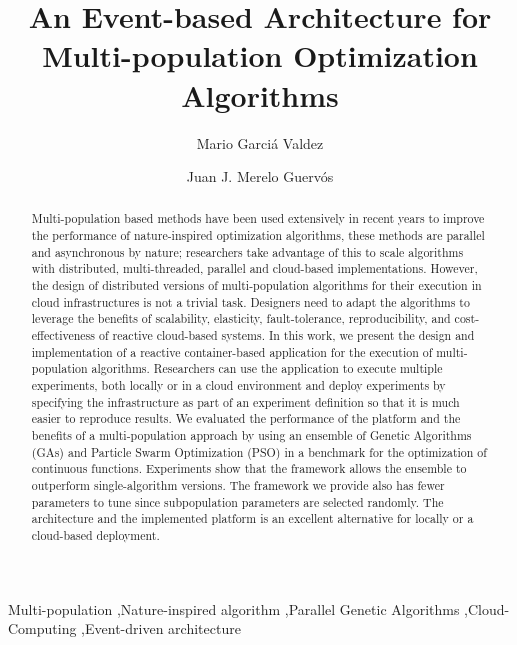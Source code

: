 \documentclass[review]{elsarticle}
\begin{document}
\begin{frontmatter}

\title{An Event-based Architecture for Multi-population Optimization Algorithms}

\author[itt]{Mario Garci\'a Valdez}

\author[granada]{Juan J. Merelo Guerv\'os}

\address[itt]{Department of Graduate Studies, Instituto Tecnol\'ogico de Tijuana, Tijuana BC, Mexico}
\address[granada]{Universidad de Granada, Granada, Spain}

\begin{abstract} 
Multi-population based methods have been used extensively in
recent years to improve the performance of nature-inspired optimization
algorithms, these methods are parallel and asynchronous by nature; researchers
take advantage of this to scale algorithms with distributed, multi-threaded,
parallel and cloud-based implementations. However, the design of distributed
versions of multi-population algorithms for their execution in cloud
infrastructures is not a trivial task. Designers need to adapt the algorithms to
leverage the benefits of scalability, elasticity, fault-tolerance,
reproducibility, and cost-effectiveness of reactive cloud-based systems. In this
work, we present the design and implementation of a reactive container-based
application for the execution of multi-population algorithms. Researchers can
use the application to execute multiple experiments, both locally or in a cloud
environment and deploy experiments by specifying the infrastructure as part of
an experiment definition so that it is much easier to reproduce results. We
evaluated the performance of the platform and the benefits of a multi-population
approach by using an ensemble of Genetic Algorithms (GAs) and Particle Swarm
Optimization (PSO) in a benchmark for the optimization of continuous functions.
Experiments show that the framework allows the ensemble to outperform
single-algorithm versions. The framework we provide also has fewer parameters to
tune since subpopulation parameters are selected randomly. The architecture and
the implemented platform is an excellent alternative for locally or a
cloud-based deployment. 
\end{abstract}

\begin{keyword}
Multi-population \sep Nature-inspired algorithm \sep Parallel Genetic Algorithms \sep Cloud-Computing
\sep Event-driven architecture 
\end{keyword}

\end{frontmatter}
\end{document}

